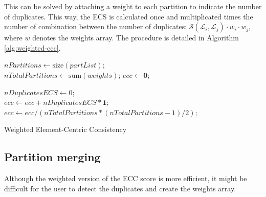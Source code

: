 This can be solved by attaching a weight to each partition to indicate the number of duplicates. This way, the ECS is calculated once and multiplicated times the number of combination between the number of duplicates: $\mathcal{S}(\mathcal{L}_i, \mathcal{L}_j) \cdot w_i \cdot w_j$, where $w$ denotes the weights array. The procedure is detailed in Algorithm \ref{alg:weighted-ecc}. 

\begin{algorithm}[h!] 

    $nPartitions \gets \text{size}(partList)$; \\
    $nTotalPartitions \gets \text{sum}(weights)$; 
    $ecc \gets \textbf{0}$; \\
    
    $nDuplicatesECS \gets 0$; \\
    $ecc \gets ecc + nDuplicatesECS * \textbf{1};$ \\
    $ecc \gets ecc / (nTotalPartitions * (nTotalPartitions - 1) / 2);$ \\
    \caption{Weighted Element-Centric Consistency}
    \label{alg:weighted-ecc}
\end{algorithm}

\subsection{Partition merging}
Although the weighted version of the ECC score is more efficient, it might be difficult for the user to detect the duplicates and create the weights array.

